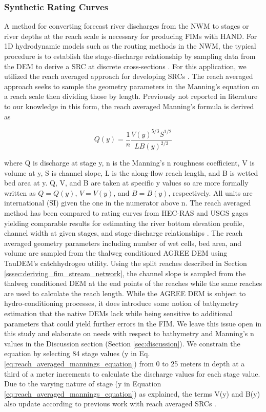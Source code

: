 \subsubsection{Synthetic Rating Curves}
\label{sssec:synthetic_rating_curve}
%
A method for converting forecast river discharges from the NWM to stages or river depths at the reach scale is necessary for producing FIMs with HAND. 
For 1D hydrodynamic models such as the routing methods in the NWM, the typical procedure is to establish the stage-discharge relationship by sampling data from the DEM to derive a SRC at discrete cross-sections \cite{quintero2021development,di2011hydraulic}. 
For this application, we utilized the reach averaged approach for developing SRCs \cite{zheng2018river}.
The reach averaged approach seeks to sample the geometry parameters in the Manning's equation \cite{gauckler1867etudes,manning1890flow} on a reach scale then dividing those by length. 
Previously not reported in literature to our knowledge in this form, the reach averaged Manning's formula is derived as 
%
\begin{linenomath*}
\begin{equation}
\label{eq:reach_averaged_mannings_equation}
Q(y) = \frac{1}{n} \frac{V(y)^{5/3}S^{1/2}}{L B(y)^{2/3}} 
\end{equation}
\end{linenomath*}
%
where Q is discharge at stage y, n is the Manning's n roughness coefficient, V is volume at y, S is channel slope, L is the along-flow reach length, and B is wetted bed area at y.
Q, V, and B are taken at specific y values so are more formally written as $Q = Q(y)$, $V = V(y)$, and $B = B(y)$, respectively.
All units are international (SI) given the one in the numerator above n.
The reach averaged method has been compared to rating curves from HEC-RAS and USGS gages yielding comparable results for estimating the river bottom elevation profile, channel width at given stages, and stage-discharge relationships \cite{zheng2018river}.
The reach averaged geometry parameters including number of wet cells, bed area, and volume are sampled from the thalweg conditioned AGREE DEM using TauDEM's catchhydrogeo utility.
Using the split reaches described in Section \ref{sssec:deriving_fim_stream_network}, the channel slope is sampled from the thalweg conditioned DEM at the end points of the reaches while the same reaches are used to calculate the reach length.
While the AGREE DEM is subject to hydro-conditioning processes, it does introduce some notion of bathymetry estimation that the native DEMs lack while being sensitive to additional parameters that could yield further errors in the FIM.
We leave this issue open in this study and elaborate on needs with respect to bathymetry and Manning's n values in the Discussion section (Section \ref{sec:discussion}).
We constrain the equation by selecting 84 stage values (y in Eq. \ref{eq:reach_averaged_mannings_equation}) from 0 to 25 meters in depth at a third of a meter increments to calculate the discharge values for each stage value. 
Due to the varying nature of stage (y in Equation \ref{eq:reach_averaged_mannings_equation}) as explained, the terms V(y) and B(y) also update according to previous work with reach averaged SRCs \cite{zheng2018river}.

